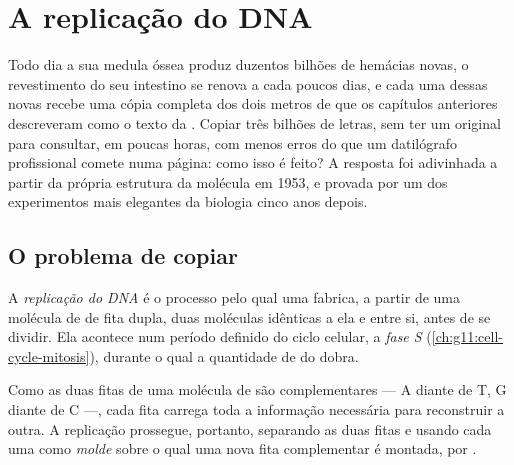 \chapter{A replicação do DNA}\label{ch:g11:dna-replication}

Todo dia a sua medula óssea produz duzentos bilhões de hemácias novas,
o revestimento do seu intestino se renova a cada poucos dias, e cada
uma dessas  novas recebe uma cópia completa dos dois metros de
 que os capítulos anteriores descreveram como o texto da .
Copiar três bilhões de letras, sem ter um original para consultar, em
poucas horas, com menos erros do que um datilógrafo profissional comete
numa página: como isso é feito? A resposta foi adivinhada a partir da
própria estrutura da molécula em 1953, e provada por um dos
experimentos mais elegantes da biologia cinco anos depois.

\section{O problema de copiar}

\begin{definition}[Replicação]\label{def:g11:dna-replication:replication}
A \emph{replicação do DNA} é o processo pelo
qual uma  fabrica, a partir de uma molécula de  de fita dupla,
duas moléculas idênticas a ela e entre si, antes de se dividir. Ela
acontece num período definido do ciclo celular, a \emph{fase S}
(\cref{ch:g11:cell-cycle-mitosis}), durante o qual a quantidade de 
do  dobra.
\end{definition}

\begin{proposition}\label{prop:g11:dna-replication:template}
Como as duas fitas de uma molécula de  são complementares --- A
diante de T, G diante de C ---, cada fita carrega toda a informação
necessária para reconstruir a outra. A replicação prossegue, portanto,
separando as duas fitas e usando cada uma como \emph{molde} sobre o
qual uma nova fita complementar é montada,  por .
\end{proposition}
\admitted

